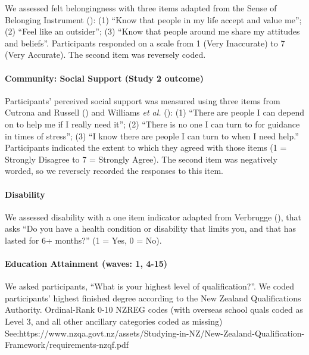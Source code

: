 \documentclass[
  single column]{article}
\let\oldparagraph\paragraph
\renewcommand{\paragraph}[1]{\oldparagraph{#1}\mbox{}}
\begin{document}
We assessed felt belongingness with three items adapted from the Sense
of Belonging Instrument (): (1) ``Know that people in my life accept and value me''; (2)
``Feel like an outsider''; (3) ``Know that people around me share my
attitudes and beliefs''. Participants responded on a scale from 1 (Very
Inaccurate) to 7 (Very Accurate). The second item was reversely coded.

\paragraph{Community: Social Support (Study 2
outcome)}\label{community-social-support-study-2-outcome}

Participants' perceived social support was measured using three items
from Cutrona and Russell () and Williams
\emph{et al.} (): (1)
``There are people I can depend on to help me if I really need it''; (2)
``There is no one I can turn to for guidance in times of stress''; (3)
``I know there are people I can turn to when I need help.'' Participants
indicated the extent to which they agreed with those items (1 = Strongly
Disagree to 7 = Strongly Agree). The second item was negatively worded,
so we reversely recorded the responses to this item.

\paragraph{Disability}\label{disability}

We assessed disability with a one item indicator adapted from Verbrugge
(), that asks ``Do you have a health
condition or disability that limits you, and that has lasted for 6+
months?'' (1 = Yes, 0 = No).

\paragraph{Education Attainment (waves: 1,
4-15)}\label{education-attainment-waves-1-4-15}

We asked participants, ``What is your highest level of qualification?''.
We coded participants' highest finished degree according to the New
Zealand Qualifications Authority. Ordinal-Rank 0-10 NZREG codes (with
overseas school quals coded as Level 3, and all other ancillary
categories coded as missing)
See:https://www.nzqa.govt.nz/assets/Studying-in-NZ/New-Zealand-Qualification-Framework/requirements-nzqf.pdf
\end{document}
